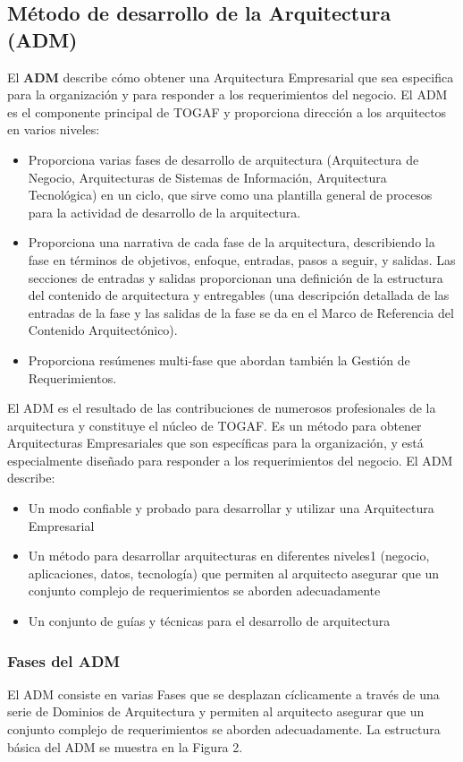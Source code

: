   \subsection{Método de desarrollo de la Arquitectura (ADM)}
  El \textbf{ADM} describe cómo obtener una Arquitectura Empresarial que sea especifica para la organización y para responder a los requerimientos del negocio. El ADM es el componente principal de TOGAF y proporciona dirección a los arquitectos en varios niveles:
  \begin{itemize}
  	\item Proporciona varias fases de desarrollo de arquitectura (Arquitectura de Negocio, Arquitecturas de Sistemas de Información, Arquitectura Tecnológica) en un ciclo, que sirve como una plantilla general de procesos para la actividad de desarrollo de la arquitectura.
  	\item Proporciona una narrativa de cada fase de la arquitectura, describiendo la fase en términos de objetivos, enfoque, entradas, pasos a seguir, y salidas. Las secciones de entradas y salidas proporcionan una definición de la estructura del contenido de arquitectura y entregables (una descripción detallada de las entradas de la fase y las salidas de la fase se da en el Marco de Referencia del Contenido Arquitectónico).
  	\item Proporciona resúmenes multi-fase que abordan también la Gestión de Requerimientos.
  \end{itemize}
  
  El ADM es el resultado de las contribuciones de numerosos profesionales de la arquitectura y constituye el núcleo de TOGAF. Es un método para obtener Arquitecturas Empresariales que son específicas para la organización, y está especialmente diseñado para responder a los requerimientos del negocio. El ADM describe:
  
  \begin{itemize}
  	\item Un modo confiable y probado para desarrollar y utilizar una Arquitectura Empresarial
  	\item Un método para desarrollar arquitecturas en diferentes niveles1 (negocio, aplicaciones, datos, tecnología) que permiten al arquitecto asegurar que un conjunto complejo de requerimientos se aborden adecuadamente
  	\item Un conjunto de guías y técnicas para el desarrollo de arquitectura
 \end{itemize}
  
  \subsubsection{Fases del ADM}
  El ADM consiste en varias Fases que se desplazan cíclicamente a través de una serie de Dominios de Arquitectura y permiten al arquitecto asegurar que un conjunto complejo de requerimientos se aborden adecuadamente. La estructura básica del ADM se muestra en la Figura 2.
  
